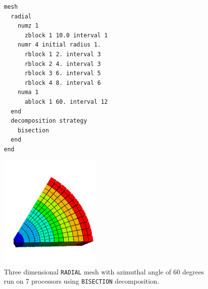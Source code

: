 \begin{figure}[htbp]
\centering
  \begin{minipage}[c]{0.4\linewidth}
    \centering
{\ttfamily \begin{verbatim}
mesh
  radial
    numz 1
      zblock 1 10.0 interval 1
    numr 4 initial radius 1.
      rblock 1 2. interval 3
      rblock 2 4. interval 3
      rblock 3 6. interval 5
      rblock 4 8. interval 6
    numa 1
      ablock 1 60. interval 12
  end
  decomposition strategy
    bisection
  end
end
\end{verbatim}}
  \end{minipage}%
  \hfil
  \begin{minipage}[c]{0.6\linewidth}
    \centering
      \includegraphics[width=2.0in]{figures/bisect_7_white}
  \end{minipage}
  \caption [\texttt{BISECTION} decomposition run on 7 processors.] {Three dimensional \texttt{RADIAL} mesh with azimuthal
    angle of 60 degrees run on 7 processors using \texttt{BISECTION} decomposition.}
  \label{fig:dec_bis}
\end{figure}


